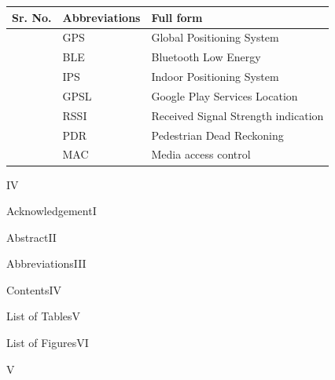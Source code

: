 \documentclass[a4paper, 12pt]{article}
\begin{document}
{\raggedright
\vspace{3pt} \noindent \begin{tabular}{|p{100pt}|p{167pt}|p{148pt}|}
\hline
\parbox{100pt}{\centering \textbf{Sr. No.}} & 
\parbox{167pt}{\centering \textbf{Abbreviations}} & 
\parbox{148pt}{\centering \textbf{Full form}} \\
\hline
\parbox{100pt}{} & 
\parbox{167pt}{\centering GPS} & 
\parbox{148pt}{\centering Global Positioning System} \\
\hline
\parbox{100pt}{} & 
\parbox{167pt}{\centering BLE} & 
\parbox{148pt}{\centering Bluetooth Low Energy} \\
\hline
\parbox{100pt}{} & 
\parbox{167pt}{\centering IPS} & 
\parbox{148pt}{\centering Indoor Positioning System} \\
\hline
\parbox{100pt}{} & 
\parbox{167pt}{\centering GPSL} & 
\parbox{148pt}{\centering Google Play Services Location} \\
\hline
\parbox{100pt}{} & 
\parbox{167pt}{\centering RSSI} & 
\parbox{148pt}{\centering Received Signal Strength indication} \\
\hline
\parbox{100pt}{} & 
\parbox{167pt}{\centering PDR} & 
\parbox{148pt}{\centering Pedestrian Dead Reckoning} \\
\hline
\parbox{100pt}{} & 
\parbox{167pt}{\centering MAC} & 
\parbox{148pt}{\centering Media access control} \\
\hline


\end{tabular}
\vspace{2pt}

}
\newpage
\begin{center}
    IV
\end{center}
{\raggedright Acknowledgement\hspace{320pt}I}
\linebreak
{\raggedright Abstract\hspace{367pt}II}
\linebreak
{\raggedright Abbreviations\hspace{340pt}III}
\linebreak
{\raggedright Contents\hspace{365pt}IV}
\linebreak
{\raggedright List of Tables\hspace{343pt}V}
\linebreak
{\raggedright List of Figures\hspace{338pt}VI}
\linebreak
\tableofcontents
\newpage
\begin{center}
    V
\end{center}
\end{document}

